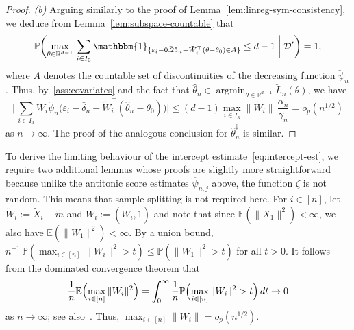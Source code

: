 \documentclass[a4paper]{article}
\newcommand{\R}{\mathbb{R}}
\newcommand{\E}{\mathbb{E}}
\renewcommand{\Pr}{\mathbb{P}}
\newcommand{\Ind}{\mathbbm{1}}
\newcommand{\norm}[1]{\|{#1}\|}
\DeclareMathOperator*{\argmin}{argmin}
\theoremstyle{definition}
\begin{document}
\begin{proof}
\medskip
\noindent
\textit{(b)} Arguing similarly to the proof of Lemma~\ref{lem:linreg-sym-consistency}, we deduce from Lemma~\ref{lem:subspace-countable} that
\[
\Pr\biggl(\max_{\theta \in \R^{d-1}}\,\sum_{i \in I_3} \Ind_{\{\varepsilon_i - \bar{\delta}_n - \tilde{W}_i^\top(\theta - \theta_0) \in A\}} \leq d - 1 \biggm| \mathcal{D}'\biggr) = 1,
\]
where $A$ denotes the countable set of discontinuities of the decreasing function $\check{\psi}_n$. Thus, by~\ref{ass:covariates} and the fact that $\hat{\theta}_n \in \argmin_{\theta \in \R^{d-1}} \check{L}_n(\theta)$, we have
\[
\Biggl|\,\sum_{i \in I_3}\tilde{W}_i\check{\psi}_n\bigl(\varepsilon_i - \bar{\delta}_n - \tilde{W}_i^\top(\hat{\theta}_n - \theta_0)\bigr)\Biggr| \leq (d - 1)\max_{i \in I_3}\norm{\tilde{W}_i}\,\frac{\alpha_n}{\gamma_n} = o_p(n^{1/2})
\]
as $n \to \infty$. The proof of the analogous conclusion for $\hat{\theta}_n^\ddagger$ is similar.
\end{proof}

To derive the limiting behaviour of the intercept estimate~\eqref{eq:intercept-est}, we require two additional lemmas whose proofs are slightly more straightforward because unlike the antitonic score estimates $\hat{\psi}_{n,j}$ above, the function $\zeta$ is not random. This means that sample splitting is not required here. For $i \in [n]$, let $\breve{W}_i := \tilde{X}_i - \tilde{m}$ and $W_i := (\breve{W}_i,1)$ and note that since $\E(\norm{X_1}^2) < \infty$, we also have $\E(\norm{W_1}^2) < \infty$. By a union bound, $n^{-1}\,\Pr(\max_{i \in [n]} \norm{W_i}^2 > t) \leq \Pr(\norm{W_1}^2 > t)$ for all $t > 0$. It follows from the dominated convergence theorem that
\begin{equation}
\label{eq:expected-max}
\frac{1}{n}\E\Bigl(\max_{i \in [n]}\norm{W_i}^2\Bigr) = \int_0^\infty \frac{1}{n}\Pr\Bigl(\max_{i \in [n]}\norm{W_i}^2 > t\Bigr)\,dt \to 0
\end{equation}
as $n \to \infty$; see also~\citet[Exercise~10.6.4\emph{(a)}]{samworth24modern}. Thus, $\max_{i \in [n]}\norm{W_i} = o_p(n^{1/2})$.
\end{document}
